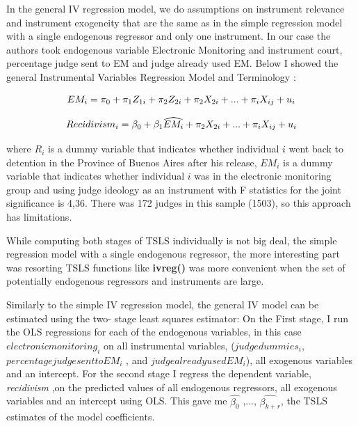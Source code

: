 \documentclass[a4paper,12pt]{article}
\begin{document}
In the general IV regression model, we do assumptions  on instrument relevance and instrument exogeneity that are the same as in the simple regression model with a single endogenous regressor and only one instrument. In our case the authors took endogenous variable Electronic Monitoring and instrument court, percentage judge sent to EM and judge already used EM. Below I showed the general Instrumental Variables Regression Model and Terminology : 

         \begin{equation}
    \centering
    EM_i = \pi_0 + \pi_1Z_{1i} + \pi_2Z_{2i} + \pi_2X_{2i} + ... + \pi_iX_{ij} + u_i  
    \end{equation}
    
        
         \begin{equation}
    \centering
    Recidivism_i = \beta_0 + \beta_1\widehat{EM_i} + \pi_2X_{2i} + ... + \pi_iX_{ij} + u_i  
\end{equation}

where $R_i$ is a dummy variable that indicates whether individual $i$ went back to detention in the Province of Buenos Aires after his release, $EM_i$ is a dummy variable that indicates whether individual $i$ was in the electronic monitoring group and using judge ideology as an instrument with F statistics for the joint significance is 4,36. There was 172 judges in this sample (1503), so this approach has limitations. 

While computing both stages of TSLS individually is not big deal, the simple regression model with a single endogenous regressor, the more interesting part was resorting TSLS functions like \textbf{ivreg()} was more convenient when the set of potentially endogenous regressors and instruments are large. 

Similarly to the simple IV regression model, the general IV model can be estimated using the two- stage least squares estimator: On the First stage, I run the OLS regressions for each of the endogenous variables, in this case $electronic monitoring_i$ on all instrumental variables, ($judge dummies_i$, $percentage judge sent to EM_i$ , and $judge already used EM_i$), all exogenous variables and an intercept. For the second stage I regress the dependent variable, \textit{recidivism} ,on the predicted values of all endogenous regressors, all exogenous variables and an intercept using OLS. This gave me $\widehat{\beta_0}$ ,..., $\widehat{\beta_{k+r}}$, the TSLS estimates of the model coefficients. 
\end{document}
